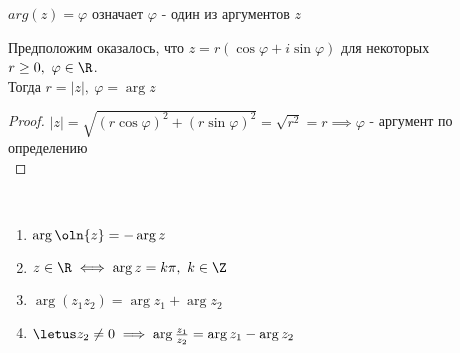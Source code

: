 \begin{defn}
    $arg(z) = \varphi$ означает $\varphi$ - один из аргументов $z$
\end{defn}

\begin{notice}
    Предположим оказалось, что $z = r(\cos\varphi + i\sin\varphi)$ для некоторых $r \geq 0,~\varphi \in \R$.\\
    Тогда $r = |z|,~\varphi = \arg z$
\end{notice}

\begin{proof}
    $|z| = \sqrt{(r\cos\varphi)^2 + (r\sin\varphi)^2} = \sqrt{r^2} = r \implies \varphi$ - аргумент по определению\\
\end{proof}

\begin{theorem-non}~
    \begin{enumerate}
        \item $\arg \oln{z} = -\arg z$
        \item $z \in \R \iff \arg z = k \pi,~k \in \Z$
        \item $\arg(z_1 z_2) = \arg z_1 + \arg z_2$
        \item $\letus z_2 \neq 0 \implies \arg \frac{z_1}{z_2} = \arg z_1 - \arg z_2$
    \end{enumerate}
\end{theorem-non}

